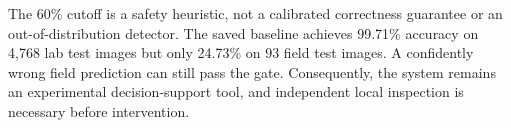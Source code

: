 The 60\% cutoff is a safety heuristic, not a calibrated correctness guarantee or an out-of-distribution detector. The saved baseline achieves 99.71\% accuracy on 4,768 lab test images but only 24.73\% on 93 field test images. A confidently wrong field prediction can still pass the gate. Consequently, the system remains an experimental decision-support tool, and independent local inspection is necessary before intervention.

